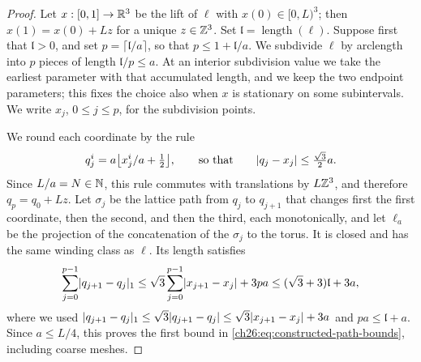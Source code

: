 \begin{proof}
Let $x:[0,1]\to\mathbb R^3$ be the lift of $\ell$ with $x(0)\in[0,L)^3$; then $x(1)=x(0)+Lz$ for a unique $z\in\mathbb Z^3$. Set $\mathfrak l=\operatorname{length}(\ell)$. Suppose first that $\mathfrak l>0$, and set $p=\lceil\mathfrak l/a\rceil$, so that $p\le1+\mathfrak l/a$. We subdivide $\ell$ by arclength into $p$ pieces of length $\mathfrak l/p\le a$. At an interior subdivision value we take the earliest parameter with that accumulated length, and we keep the two endpoint parameters; this fixes the choice also when $x$ is stationary on some subintervals. We write $x_j$, $0\le j\le p$, for the subdivision points.

We round each coordinate by the rule
\[
 q_j^i=a\bigl\lfloor x_j^i/a+\tfrac12\bigr\rfloor,\qquad\text{so that}\qquad \lvert q_j-x_j\rvert\le\tfrac{\sqrt3}{2}a .
\]
Since $L/a=N\in\mathbb N$, this rule commutes with translations by $L\mathbb Z^3$, and therefore $q_p=q_0+Lz$. Let $\sigma_j$ be the lattice path from $q_j$ to $q_{j+1}$ that changes first the first coordinate, then the second, and then the third, each monotonically, and let $\ell_a$ be the projection of the concatenation of the $\sigma_j$ to the torus. It is closed and has the same winding class as $\ell$. Its length satisfies
\[
 \sum_{j=0}^{p-1}\lvert q_{j+1}-q_j\rvert_1\le\sqrt3\sum_{j=0}^{p-1}\lvert x_{j+1}-x_j\rvert+3pa\le(\sqrt3+3)\mathfrak l+3a,
\]
where we used $\lvert q_{j+1}-q_j\rvert_1\le\sqrt3\lvert q_{j+1}-q_j\rvert\le\sqrt3\lvert x_{j+1}-x_j\rvert+3a$ and $pa\le\mathfrak l+a$. Since $a\le L/4$, this proves the first bound in \eqref{ch26:eq:constructed-path-bounds}, including coarse meshes.


\end{proof}

